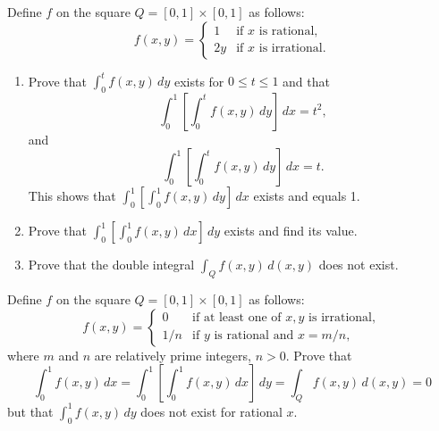 \begin{problembox}
Define \( f \) on the square \( Q = [0, 1] \times [0, 1] \) as follows:
\[ f(x, y) = 
\begin{cases} 
1 & \text{if } x \text{ is rational}, \\
2y & \text{if } x \text{ is irrational}. 
\end{cases} \]
\begin{enumerate}[label=(\alph*)]
    \item Prove that \( \int_{0}^{t} f(x, y) \, dy \) exists for \( 0 \leq t \leq 1 \) and that
    \[ \int_{0}^{1} \left[ \int_{0}^{t} f(x, y) \, dy \right] \, dx = t^2, \]
    and \[ \int_{0}^{1} \left[ \int_{0}^{t} f(x, y) \, dy \right] \, dx = t. \]
    This shows that \( \int_{0}^{1} \left[ \int_{0}^{1} f(x, y) \, dy \right] \, dx \) exists and equals 1.
    
    \item Prove that \( \int_{0}^{1} \left[ \int_{0}^{1} f(x, y) \, dx \right] \, dy \) exists and find its value.
    \item Prove that the double integral \( \int_{Q} f(x, y) \, d(x, y) \) does not exist.
\end{enumerate}
\end{problembox}

\begin{problembox}
Define \( f \) on the square \( Q = [0, 1] \times [0, 1] \) as follows:
\[f(x, y) = 
\begin{cases} 
0 & \text{if at least one of } x, y \text{ is irrational}, \\ 
1/n & \text{if } y \text{ is rational and } x = m/n,
\end{cases}\]
where \( m \) and \( n \) are relatively prime integers, \( n > 0 \). Prove that
\[\int_{0}^{1} f(x, y) \, dx = \int_{0}^{1} \left[ \int_{0}^{1} f(x, y) \, dx \right] \, dy = \int_{Q} f(x, y) \, d(x, y) = 0\]
but that \( \int_{0}^{1} f(x, y) \, dy \) does not exist for rational \( x \).
\end{problembox}

